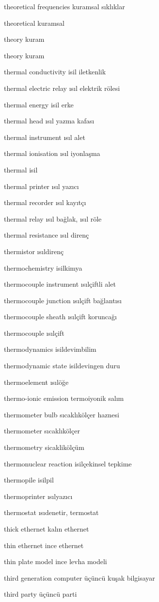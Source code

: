 \documentclass[12pt,fleqn]{article}\usepackage{../../common}
\begin{document}
theoretical frequencies kuramsal sıklıklar

theoretical kuramsal

theory kuram

theory kuram

thermal conductivity isil iletkenlik

thermal electric relay ısıl elektrik rölesi

thermal energy isil erke

thermal head ısıl yazma kafası

thermal instrument ısıl alet

thermal ionisation ısıl iyonlaşma

thermal isil

thermal printer ısıl yazıcı

thermal recorder ısıl kayıtçı

thermal relay ısıl bağlak, ısıl röle

thermal resistance ısıl direnç

thermistor ısıldirenç

thermochemistry isilkimya

thermocouple instrument ısılçiftli alet

thermocouple junction ısılçift bağlantısı

thermocouple sheath ısılçift koruncağı

thermocouple ısılçift

thermodynamics isildevimbilim

thermodynamic state isildevingen duru

thermoelement ısılöğe

thermo-ionic emission termoiyonik salım

thermometer bulb sıcaklıkölçer haznesi

thermometer sıcaklıkölçer

thermometry sicaklikölçüm

thermonuclear reaction isilçekinsel tepkime

thermopile isilpil

thermoprinter ısılyazıcı

thermostat ısıdenetir, termostat

thick ethernet kalın ethernet

thin ethernet ince ethernet

thin plate model ince levha modeli

third generation computer üçüncü kuşak bilgisayar

third party üçüncü parti
\end{document}
